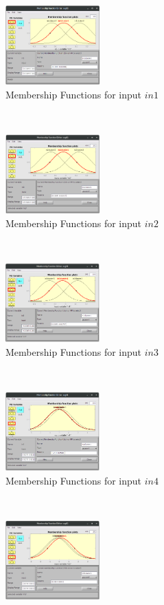 \documentclass[11pt]{article}
\begin{document}
\begin{figure}[ht]
	\centering
	\begin{subfigure}[t]{0.3\textwidth}
		\centering
		\includegraphics[height=1.2in]{images/subtractive_in1}
		\caption{Membership Functions for input $in1$}
	\end{subfigure}
	~ 
	\begin{subfigure}[t]{0.3\textwidth}
		\centering
		\includegraphics[height=1.2in]{images/subtractive_in2}
		\caption{Membership Functions for input $in2$}
	\end{subfigure}
	~
	\begin{subfigure}[t]{0.3\textwidth}
		\centering
		\includegraphics[height=1.2in]{images/subtractive_in3}
		\caption{Membership Functions for input $in3$}
	\end{subfigure}
	\\
	\begin{subfigure}[t]{0.3\textwidth}
		\centering
		\includegraphics[height=1.2in]{images/subtractive_in4}
		\caption{Membership Functions for input $in4$}
	\end{subfigure}
	~ 
	\begin{subfigure}[t]{0.3\textwidth}
		\centering
		\includegraphics[height=1.2in]{images/subtractive_in5}

\end{subfigure}
\end{figure}
\end{document}
